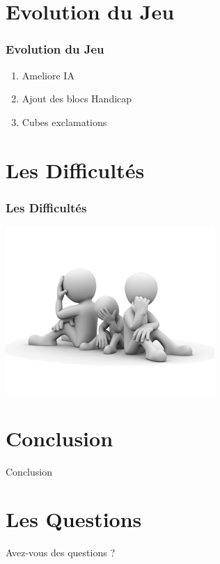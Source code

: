 \documentclass{beamer}
\begin{document}
\begin{darkframes}
     \section{Evolution du Jeu}
 \begin{frame}
  \frametitle{Evolution du Jeu}
 	   \begin{enumerate}
    \item Ameliore IA
    \item Ajout des blocs Handicap
    \item Cubes exclamations
  \end{enumerate}
    \end{frame}


     \section{Les Difficultés}
 \begin{frame}
  \frametitle{Les Difficultés}
   	 \begin{center}
  \includegraphics[scale=0.60]{./Image/difficulte.png}
  		\end{center}
    \end{frame}
    
         \section{Conclusion}
 \begin{frame}
   	 \begin{center}
  \Huge	 Conclusion
  		\end{center}
    \end{frame}
    
     \section{Les Questions}
 \begin{frame}
   	 \begin{center}
  	 \Huge	 Avez-vous des questions ?
  		\end{center}
    \end{frame}
    
  \end{darkframes}
\end{document}
